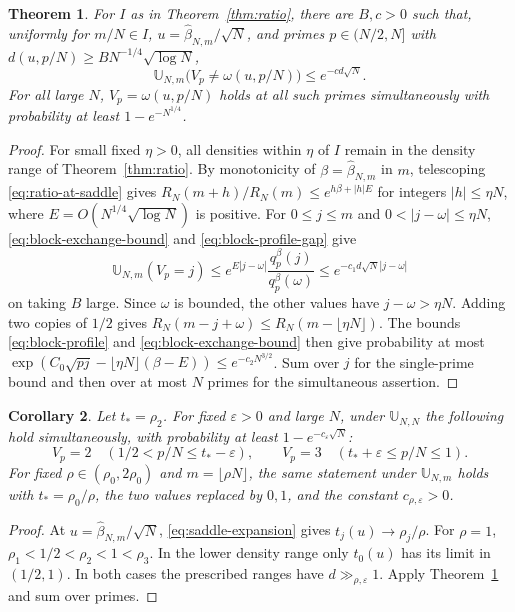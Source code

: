 \documentclass[11pt]{amsart}
\newtheorem{theorem}{Theorem}[section]
\newtheorem{corollary}[theorem]{Corollary}
\theoremstyle{remark}
\begin{document}
\begin{theorem}
\label{thm:top-concentration}
For \(I\) as in Theorem~\ref{thm:ratio}, there are \(B,c>0\) such that,
uniformly for \(m/N\in I\), \(u=\widehat\beta_{N,m}/\sqrt N\), and primes
\(p\in(N/2,N]\) with \(d(u,p/N)\ge B N^{-1/4}\sqrt{\log N}\),
\[
 \mathbb U_{N,m}\bigl(V_p\ne\omega(u,p/N)\bigr)\le e^{-c d\sqrt N}.
\]
For all large \(N\), \(V_p=\omega(u,p/N)\) holds at all such primes
simultaneously with probability at least \(1-e^{-N^{1/4}}\).
\end{theorem}

\begin{proof}
For small fixed \(\eta>0\), all densities within \(\eta\) of \(I\)
remain in the density range of Theorem~\ref{thm:ratio}.
By monotonicity of \(\beta=\widehat\beta_{N,m}\) in \(m\), telescoping
\eqref{eq:ratio-at-saddle} gives
\(R_N(m+h)/R_N(m)\le e^{h\beta+|h|E}\) for integers \(|h|\le\eta N\),
where \(E=O(N^{1/4}\sqrt{\log N})\) is positive.
For \(0\le j\le m\) and \(0<|j-\omega|\le\eta N\),
\eqref{eq:block-exchange-bound} and \eqref{eq:block-profile-gap} give
\[
 \mathbb U_{N,m}(V_p=j)
 \le e^{E|j-\omega|}\frac{q_p^\beta(j)}{q_p^\beta(\omega)}
 \le e^{-c_1d\sqrt N|j-\omega|}
\]
on taking \(B\) large. Since \(\omega\) is bounded, the other values
have \(j-\omega>\eta N\). Adding two copies of \(1/2\) gives
\(R_N(m-j+\omega)\le R_N(m-\lfloor\eta N\rfloor)\).
The bounds \eqref{eq:block-profile} and \eqref{eq:block-exchange-bound}
then give probability at most
\(\exp(C_0\sqrt{pj}-\lfloor\eta N\rfloor(\beta-E))\le e^{-c_2N^{3/2}}\).
Sum over \(j\) for the single-prime bound and then over at most \(N\)
primes for the simultaneous assertion.
\end{proof}

\begin{corollary}
\label{cor:diagonal-concentration}
Let \(t_*=\rho_2\). For fixed \(\varepsilon>0\) and large \(N\),
under \(\mathbb U_{N,N}\) the following hold simultaneously, with
probability at least \(1-e^{-c_\varepsilon\sqrt N}\):
\[
 V_p=2\quad(1/2<p/N\le t_*-\varepsilon),\qquad
 V_p=3\quad(t_*+\varepsilon\le p/N\le1).
\]
For fixed \(\rho\in(\rho_0,2\rho_0)\) and \(m=\lfloor\rho N\rfloor\),
the same statement under \(\mathbb U_{N,m}\) holds with \(t_*=\rho_0/\rho\),
the two values replaced by \(0,1\), and the constant \(c_{\rho,\varepsilon}>0\).
\end{corollary}

\begin{proof}
At \(u=\widehat\beta_{N,m}/\sqrt N\), \eqref{eq:saddle-expansion} gives
\(t_j(u)\to \rho_j/\rho\). For \(\rho=1\),
\(\rho_1<1/2<\rho_2<1<\rho_3\). In the lower density range only
\(t_0(u)\) has its limit in \((1/2,1)\). In both cases the prescribed
ranges have \(d\gg_{\rho,\varepsilon}1\). Apply
Theorem~\ref{thm:top-concentration} and sum over primes.
\end{proof}
\end{document}
